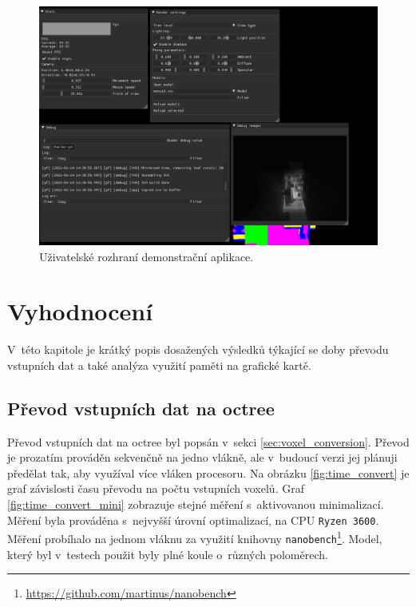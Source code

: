 \begin{figure}[H]
	\centering
	\includegraphics[scale=1]{obrazky-figures/svo_ui.png}
	\caption{Uživatelské rozhraní demonstrační aplikace.}
	\label{fig:svo_ui}
\end{figure}


\chapter{Vyhodnocení}
\label{testovani}
V~této kapitole je krátký popis dosažených výsledků týkající se doby převodu vstupních dat a také analýza využití paměti na grafické kartě.

\section{Převod vstupních dat na octree}
Převod vstupních dat na octree byl popsán v~sekci \ref{sec:voxel_conversion}. Převod je prozatím prováděn sekvenčně na jedno vlákně, ale v~budoucí verzi jej plánuji předělat tak, aby využíval více vláken procesoru. Na obrázku \ref{fig:time_convert} je graf závislosti času převodu na počtu vstupních voxelů. Graf \ref{fig:time_convert_mini} zobrazuje stejné měření s~aktivovanou minimalizací. Měření byla prováděna s~nejvyšší úrovní optimalizací, na CPU \texttt{Ryzen 3600}. Měření probíhalo na jednom vláknu za využití knihovny \texttt{nanobench}\footnote{\url{https://github.com/martinus/nanobench}}. Model, který byl v~testech použit byly plné koule o~různých poloměrech.


